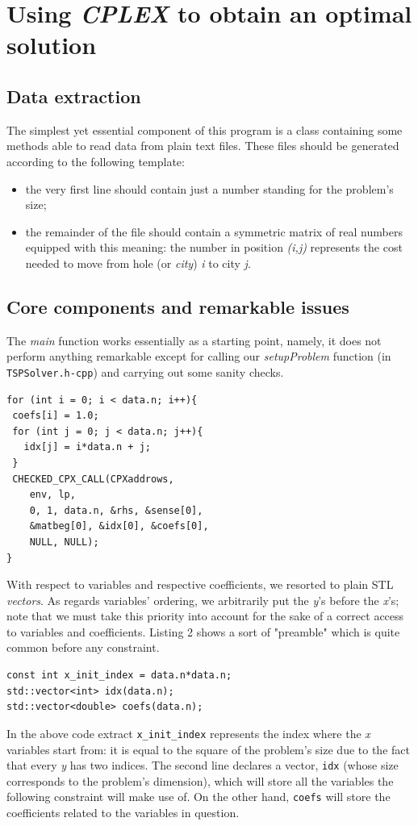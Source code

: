 \documentclass[letterpaper, 10 pt, conference]{ieeeconf}  %
\begin{document}
\section{Using \textit{CPLEX} to obtain an optimal solution}

\subsection{Data extraction}
The simplest yet essential component of this program is a class containing some methods able to read data from plain text files. These files should be generated according to the following template:
\begin{itemize}
\item the very first line should contain just a number standing for the problem's size;
\item the remainder of the file should contain a symmetric matrix of real numbers equipped with this meaning: the number in position \textit{(i,j)} represents the cost needed to move from hole (or \textit{city}) \textit{i} to city \textit{j}.
\end{itemize}

\subsection{Core components and remarkable issues}
The \textit{main} function works essentially as a starting point, namely, it does not perform anything remarkable except for calling our \textit{setupProblem} function (in \texttt{TSPSolver.h-cpp}) and carrying out some sanity checks.
\lstset{language=C++,
  basicstyle=\ttfamily,
}
\begin{lstlisting}[caption={Visit constraint}]
for (int i = 0; i < data.n; i++){
 coefs[i] = 1.0;
 for (int j = 0; j < data.n; j++){
   idx[j] = i*data.n + j;
 }
 CHECKED_CPX_CALL(CPXaddrows,
    env, lp, 
    0, 1, data.n, &rhs, &sense[0], 
    &matbeg[0], &idx[0], &coefs[0],
    NULL, NULL);
}
\end{lstlisting} 
With respect to variables and respective coefficients, we resorted to plain STL 
\textit{vectors}. As regards variables' ordering, we arbitrarily put the \textit{y}'s before the \textit{x}'s; note that we must take this priority into account for the sake of a correct access to variables and coefficients. Listing 2
shows a sort of "preamble" which is quite common before any constraint.
\begin{lstlisting}[caption={Important data structure declarations}]
const int x_init_index = data.n*data.n;
std::vector<int> idx(data.n);
std::vector<double> coefs(data.n);
\end{lstlisting}
In the above code extract \texttt{x\_init\_index} represents the index where
the \textit{x} variables start from: it is equal to the square of the problem's size due to the fact that every \textit{y} has two indices. The second line declares a vector, \texttt{idx} (whose size corresponds to the problem's dimension), which will store all the variables the following constraint will make use of. On the other hand, \texttt{coefs} will store the coefficients related to the variables in question.
\end{document}
